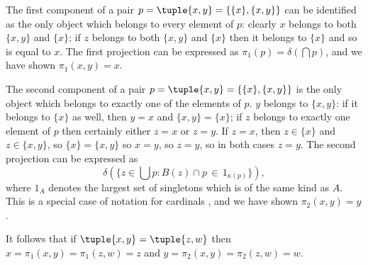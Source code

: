 \documentclass[12pt]{article}
\begin{document}
\Proof
The first component of a pair $p = \tuple{x,y} = \{\{x\},\{x,y\}\}$ can be identified as the only object which belongs to every element of $p$:  clearly $x$ belongs to both $\{x,y\}$  and $\{x\}$; if $z$ belongs to both $\{x,y\}$ and $\{x\}$ then it belongs to $\{x\}$ and so is equal to $x$.    The first projection can be expressed as $\pi_1(p) = \delta(\bigcap p)$, and we have shown $\pi_1(x,y)=x$.

The second component of a pair $p = \tuple{x,y} =\{\{x\},\{x,y\}\}$ is the only object which belongs to exactly one of the elements of $p$.  $y$ belongs to $\{x,y\}$:  if it belongs to $\{x\}$ as well, then $y=x$ and $\{x,y\}=\{x\}$;  if $z$ belongs to exactly one element of $p$ then certainly either $z=x$ or $z=y$.  If $z=x$, then $z \in \{x\}$ and $z \in \{x,y\}$, so $\{x\} = \{x,y\}$ so $x=y$, so $z=y$, so in both cases $z=y$.   The second projection can be expressed as $$\delta(\{z\in \bigcup p:B(z) \cap p\, \in\, 1_{\kappa(p)}\}),$$ where
$1_A$ denotes the largest set of singletons which is of the same kind as $A$. This is a special case of notation for cardinals
, and we have shown $\pi_2(x,y)=y$.

It follows that if $\tuple{x,y} = \tuple{z,w}$ then $x = \pi_1(x,y) = \pi_1(z,w) = z$ and $y = \pi_2(x,y) = \pi_2(z,w) = w$.




\end{document}
